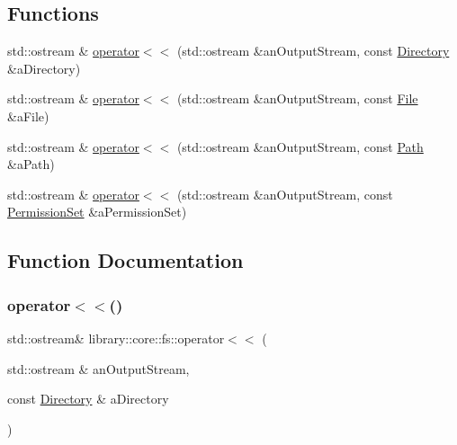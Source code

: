 \subsection*{Functions}
\begin{DoxyCompactItemize}
\item 
std\+::ostream \& \hyperlink{namespacelibrary_1_1core_1_1fs_a53ad2f08863101b5ae694faae44f811e}{operator$<$$<$} (std\+::ostream \&an\+Output\+Stream, const \hyperlink{classlibrary_1_1core_1_1fs_1_1_directory}{Directory} \&a\+Directory)
\item 
std\+::ostream \& \hyperlink{namespacelibrary_1_1core_1_1fs_a06acb7c0054dcbe216284bdadd5663ac}{operator$<$$<$} (std\+::ostream \&an\+Output\+Stream, const \hyperlink{classlibrary_1_1core_1_1fs_1_1_file}{File} \&a\+File)
\item 
std\+::ostream \& \hyperlink{namespacelibrary_1_1core_1_1fs_a47817adc842f15a3de34925de44b2de3}{operator$<$$<$} (std\+::ostream \&an\+Output\+Stream, const \hyperlink{classlibrary_1_1core_1_1fs_1_1_path}{Path} \&a\+Path)
\item 
std\+::ostream \& \hyperlink{namespacelibrary_1_1core_1_1fs_a23e125ea54e0e902d4b7fde80237d366}{operator$<$$<$} (std\+::ostream \&an\+Output\+Stream, const \hyperlink{classlibrary_1_1core_1_1fs_1_1_permission_set}{Permission\+Set} \&a\+Permission\+Set)
\end{DoxyCompactItemize}


\subsection{Function Documentation}
\mbox{\label{namespacelibrary_1_1core_1_1fs_a53ad2f08863101b5ae694faae44f811e}} 
\subsubsection{\texorpdfstring{operator$<$$<$()}{operator<<()}\hspace{0.1cm}{\footnotesize\ttfamily [1/4]}}
{\footnotesize\ttfamily std\+::ostream\& library\+::core\+::fs\+::operator$<$$<$ (\begin{DoxyParamCaption}\item[{std\+::ostream \&}]{an\+Output\+Stream,  }\item[{const \hyperlink{classlibrary_1_1core_1_1fs_1_1_directory}{Directory} \&}]{a\+Directory }\end{DoxyParamCaption})}


